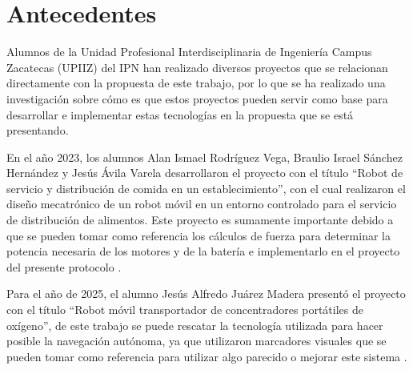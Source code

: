 %
%

\chapter{Antecedentes}
\label{cap:proto-antecedentes}


Alumnos de la Unidad Profesional Interdisciplinaria de Ingeniería Campus Zacatecas (UPIIZ) del IPN han realizado diversos proyectos que se relacionan directamente con la propuesta de este trabajo, por lo que se ha realizado una investigación sobre cómo es que estos proyectos pueden servir como base para desarrollar e implementar estas tecnologías en la propuesta que se está presentando.

En el año 2023, los alumnos Alan Ismael Rodríguez Vega, Braulio Israel Sánchez Hernández y Jesús Ávila Varela desarrollaron el proyecto con el título “Robot de servicio y distribución de comida en un establecimiento”, con el cual realizaron el diseño mecatrónico de un robot móvil en un entorno controlado para el servicio de distribución de alimentos. Este proyecto es sumamente importante debido a que se pueden tomar como referencia los cálculos de fuerza para determinar la potencia necesaria de los motores y de la batería e implementarlo en el proyecto del presente protocolo \cite{A1}.

Para el año de 2025, el alumno Jesús Alfredo Juárez Madera presentó el proyecto con el título “Robot móvil transportador de concentradores portátiles de oxígeno”, de este trabajo se puede rescatar la tecnología utilizada para hacer posible la navegación autónoma, ya que utilizaron marcadores visuales que se pueden tomar como referencia para utilizar algo parecido o mejorar este sistema \cite{A2}.

